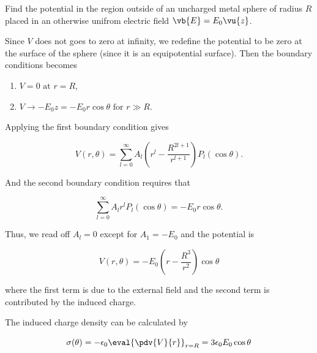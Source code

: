 \documentclass[english,a4paper,12pt]{report}
\begin{document}
{Find the potential in the region outside of an uncharged metal sphere of radius \(R\) placed in an otherwise unifrom electric field \(\vb{E} = E_0 \vu{z} \).}
{Since \(V\) does not goes to zero at infinity, we redefine the potential to be zero at the surface of the sphere (since it is an equipotential surface). Then the boundary conditions becomes
    
\begin{enumerate}[itemsep=10pt] 
    \item \(V = 0 \text { at } r = R\),
    \item \(V \rightarrow -E_0z = -E_0r\cos \theta \text { for } r \gg R\). 
\end{enumerate}

Applying the first boundary condition gives

\begin{equation}
    V(r,\theta ) = \sum_{l=0}^{\infty} A_{l} \left(r^{l}  - \frac{R^{2l+1} }{r^{l+1} } \right) P_{l} (\cos \theta ). 			
\end{equation}

And the second boundary condition requires that 

\begin{equation}
    \sum_{l=0}^{\infty} A_{l} r^{l} P_{l} (\cos \theta ) = -E_0 r\cos \theta .  
\end{equation}

Thus, we read off \(A_{l} = 0\) except for \(A_1 = -E_0 \) and the potential is 

\begin{equation}
    V(r,\theta ) = -E_0 \left(r-\frac{R^3}{r^2} \right) \cos \theta 
\end{equation}

where the first term is due to the external field and the second term is contributed by the induced charge.

The induced charge density can be calculated by 

\begin{equation}
    \sigma (\theta ) = -\epsilon_0 \eval{\pdv{V}{r} }_{r=R}^{} = 3 \epsilon_0	E_0 \cos \theta  
\end{equation}} 
\end{document}
